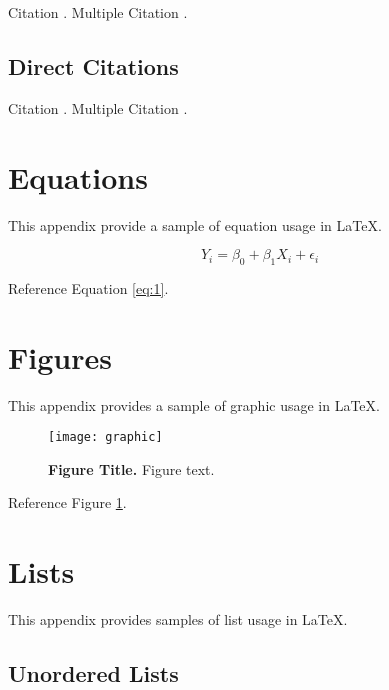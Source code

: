 Citation \citep{lastnamep:yearp}. Multiple Citation \citep{lastnamep:yearp,lastnamee:yeare,lastnamea:yeara}.

\subsection{Direct Citations} \label{direct-citations}

Citation \citet{lastnamep:yearp}. Multiple Citation \citet{lastnamep:yearp,lastnamee:yeare,lastnamea:yeara}.


\section{Equations} \label{equations}

This appendix provide a sample of equation usage in LaTeX.

\begin{equation}
\label{eq:1}
	Y_i = \beta_0 + \beta_1 X_i + \epsilon_i
\end{equation}

Reference Equation \ref{eq:1}.


\section{Figures} \label{figures}

This appendix provides a sample of graphic usage in LaTeX.

\begin{figure}[hb] \centering
	\texttt{[image: graphic]}
	\caption{\textbf{Figure Title.} Figure text.}
	\label{figure:1}
\end{figure}

Reference Figure \ref{figure:1}.


\section{Lists} \label{lists}

This appendix provides samples of list usage in LaTeX.

\subsection{Unordered Lists} \label{unordered-lists}

